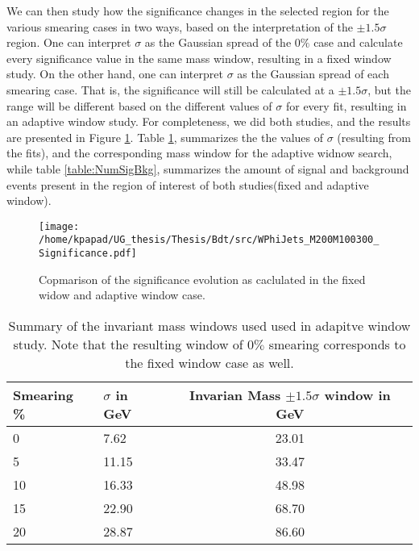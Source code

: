 We can then study how the significance changes in the selected region for the various smearing cases in two ways, based on the interpretation of the \(\pm 1.5\sigma\) region. One can interpret \(\sigma\) as the Gaussian spread of the \(0\%\) case and calculate every significance value in the same mass window, resulting in a fixed window study. On the other hand, one can interpret \(\sigma\) as the Gaussian spread of each smearing case. That is, the significance will still be calculated at a \(\pm 1.5\sigma\), but the range will be different based on the different values of \(\sigma\) for every fit, resulting in an adaptive window study. For completeness, we did both studies, and the results are presented in Figure \ref{fig:AdaFixedSig}. Table \ref{table:AdaSigmas}, summarizes the the values of \(\sigma\) (resulting from the fits), and the corresponding mass window for the adaptive widnow search, while table \ref{table:NumSigBkg}, summarizes the amount of signal and background events present in the region of interest of both studies(fixed and adaptive window).
\begin{figure}[h!]
\centering
\texttt{[image: /home/kpapad/UG\_thesis/Thesis/Bdt/src/WPhiJets\_M200M100300\_Significance.pdf]}
\caption{Copmarison of the significance evolution as caclulated in the fixed widow and adaptive window case.} 
\label{fig:AdaFixedSig}
\end{figure}
\begin{table}[htbp]
\centering
\begin{tabular}{|p{2cm}|p{2cm}|c|}
 \hline
Smearing \%  & $\sigma$ in GeV & Invarian Mass $\pm 1.5\sigma$ window  in GeV \\
\hline
0 & 7.62 & 23.01\\
5 & 11.15 & 33.47 \\ 
10 & 16.33 & 48.98 \\ 
15 & 22.90 & 68.70 \\ 
20 & 28.87 & 86.60 \\ 
 \hline
\end{tabular}
\caption{Summary of the invariant mass windows used used in adapitve window study. Note that the resulting window of $0\%$ smearing corresponds to the fixed window case as well.}
\label{table:AdaSigmas}
\end{table}
